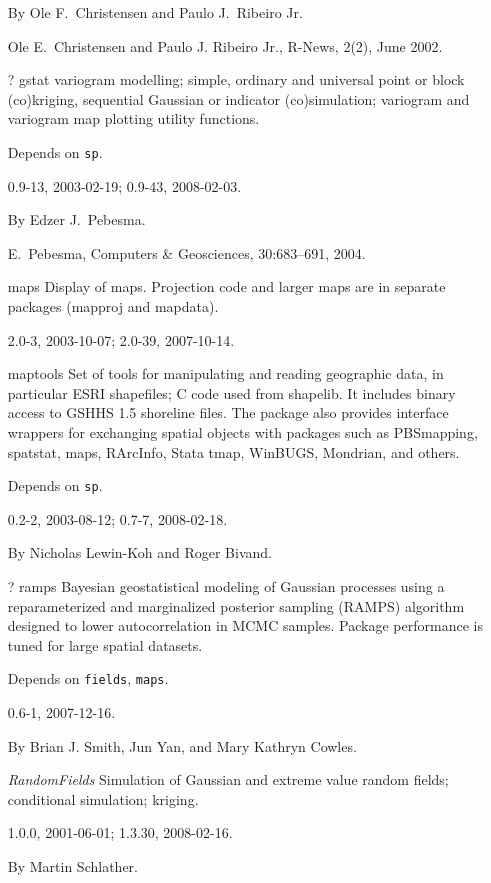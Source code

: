 \documentclass[12pt]{article}
\begin{document}
\begin{itemize}
By Ole F.\ Christensen and Paulo J.\ Ribeiro Jr.

Ole E.\ Christensen and Paulo J. Ribeiro Jr., R-News, 2(2), June 2002.

\item[? gstat]
variogram modelling; simple, ordinary and universal point or block
(co)kriging, sequential Gaussian or indicator (co)simulation; variogram
and variogram map plotting utility functions.

Depends on \texttt{sp}.

0.9-13, 2003-02-19; 0.9-43, 2008-02-03.

By Edzer J.\ Pebesma.

E.\ Pebesma, Computers \& Geosciences, 30:683--691, 2004.

\item[maps]
Display of maps. Projection code and larger maps are in separate
packages (mapproj and mapdata).

2.0-3, 2003-10-07; 2.0-39, 2007-10-14.

\item[maptools]
Set of tools for manipulating and reading geographic data, in particular
ESRI shapefiles; C code used from shapelib. It includes binary access to
GSHHS 1.5 shoreline files. The package also provides interface wrappers
for exchanging spatial objects with packages such as PBSmapping,
spatstat, maps, RArcInfo, Stata tmap, WinBUGS, Mondrian, and others.

Depends on \texttt{sp}.

0.2-2, 2003-08-12; 0.7-7, 2008-02-18.

By Nicholas Lewin-Koh and Roger Bivand.

\item[? ramps]
Bayesian geostatistical modeling of Gaussian processes using a
reparameterized and marginalized posterior sampling (RAMPS) algorithm
designed to lower autocorrelation in MCMC samples. Package performance
is tuned for large spatial datasets.

Depends on \texttt{fields}, \texttt{maps}.

0.6-1, 2007-12-16.

By Brian J. Smith, Jun Yan, and Mary Kathryn Cowles.

\item[\emph{RandomFields}]
Simulation of Gaussian and extreme value random fields; conditional
simulation; kriging.

1.0.0, 2001-06-01; 1.3.30, 2008-02-16.

By Martin Schlather.


\end{itemize}
\end{document}
